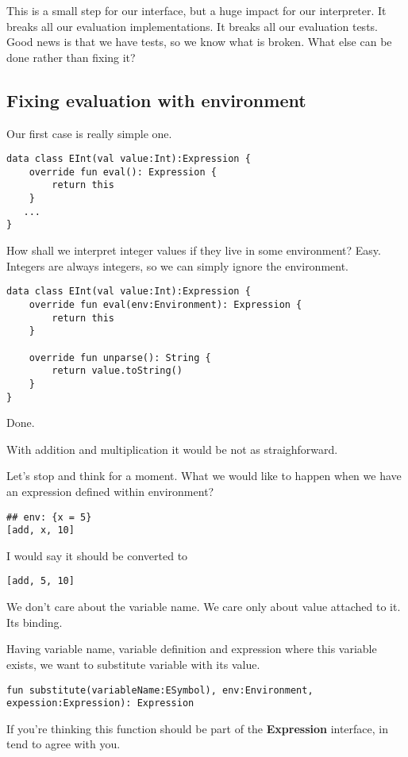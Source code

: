 \documentclass[11pt]{article}
\begin{document}
This is a small step for our interface, but a huge impact for our interpreter.
It breaks all our evaluation implementations.
It breaks all our evaluation tests.
Good news is that we have tests, so we know what is broken.
What else can be done rather than fixing it?

\subsection{Fixing evaluation with environment}
\label{sec:orgf15518f}
Our first case is really simple one.
\begin{verbatim}
data class EInt(val value:Int):Expression {
    override fun eval(): Expression {
        return this
    }
   ...
}
\end{verbatim}

How shall we interpret integer values if they live in some environment?
Easy. Integers are always integers, so we can simply ignore the environment.

\begin{verbatim}
data class EInt(val value:Int):Expression {
    override fun eval(env:Environment): Expression {
        return this
    }

    override fun unparse(): String {
        return value.toString()
    }
}
\end{verbatim}

Done.

With addition and multiplication it would be not as straighforward.

Let's stop and think for a moment.
What we would like to happen when we have an expression defined within environment?
\begin{verbatim}
## env: {x = 5}
[add, x, 10]
\end{verbatim}

I would say it should be converted to
\begin{verbatim}
[add, 5, 10]
\end{verbatim}
We don't care about the variable name. We care only about value attached to it. Its binding.

Having variable name, variable definition and expression where this variable exists, we want to substitute variable with its value.

\begin{verbatim}
fun substitute(variableName:ESymbol), env:Environment, expession:Expression): Expression
\end{verbatim}

If you're thinking this function should be part of the \textbf{Expression} interface, in tend to agree with you.
\end{document}
